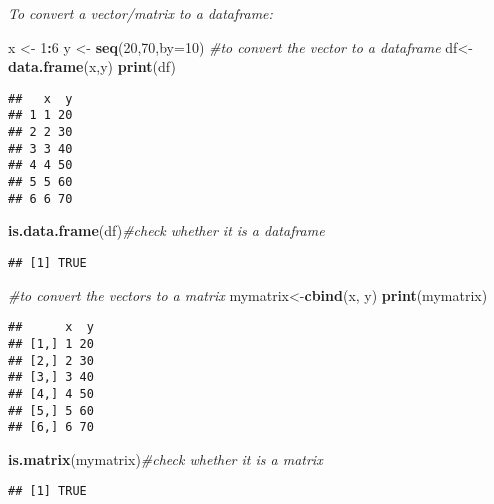 \documentclass[]{book}
\newenvironment{Shaded}{\begin{snugshade}}{\end{snugshade}}
\newcommand{\KeywordTok}[1]{\textcolor[rgb]{0.13,0.29,0.53}{\textbf{#1}}}
\newcommand{\DataTypeTok}[1]{\textcolor[rgb]{0.13,0.29,0.53}{#1}}
\newcommand{\DecValTok}[1]{\textcolor[rgb]{0.00,0.00,0.81}{#1}}
\newcommand{\StringTok}[1]{\textcolor[rgb]{0.31,0.60,0.02}{#1}}
\newcommand{\CommentTok}[1]{\textcolor[rgb]{0.56,0.35,0.01}{\textit{#1}}}
\newcommand{\OperatorTok}[1]{\textcolor[rgb]{0.81,0.36,0.00}{\textbf{#1}}}
\newcommand{\NormalTok}[1]{#1}
\theoremstyle{definition}
\theoremstyle{definition}
\theoremstyle{definition}
\theoremstyle{remark}
\begin{document}
\emph{To convert a vector/matrix to a dataframe:}

\begin{Shaded}
\begin{Highlighting}[]
\NormalTok{x <-}\StringTok{ }\DecValTok{1}\OperatorTok{:}\DecValTok{6}
\NormalTok{y <-}\StringTok{ }\KeywordTok{seq}\NormalTok{(}\DecValTok{20}\NormalTok{,}\DecValTok{70}\NormalTok{,}\DataTypeTok{by=}\DecValTok{10}\NormalTok{)}
\CommentTok{#to convert the vector to a dataframe}
\NormalTok{df<-}\KeywordTok{data.frame}\NormalTok{(x,y)}
\KeywordTok{print}\NormalTok{(df)}
\end{Highlighting}
\end{Shaded}

\begin{verbatim}
##   x  y
## 1 1 20
## 2 2 30
## 3 3 40
## 4 4 50
## 5 5 60
## 6 6 70
\end{verbatim}

\begin{Shaded}
\begin{Highlighting}[]
\KeywordTok{is.data.frame}\NormalTok{(df)}\CommentTok{#check whether it is a dataframe}
\end{Highlighting}
\end{Shaded}

\begin{verbatim}
## [1] TRUE
\end{verbatim}

\begin{Shaded}
\begin{Highlighting}[]
\CommentTok{#to convert the vectors to a matrix}
\NormalTok{mymatrix<-}\KeywordTok{cbind}\NormalTok{(x, y)}
\KeywordTok{print}\NormalTok{(mymatrix)}
\end{Highlighting}
\end{Shaded}

\begin{verbatim}
##      x  y
## [1,] 1 20
## [2,] 2 30
## [3,] 3 40
## [4,] 4 50
## [5,] 5 60
## [6,] 6 70
\end{verbatim}

\begin{Shaded}
\begin{Highlighting}[]
\KeywordTok{is.matrix}\NormalTok{(mymatrix)}\CommentTok{#check whether it is a matrix}
\end{Highlighting}
\end{Shaded}

\begin{verbatim}
## [1] TRUE
\end{verbatim}
\end{document}
